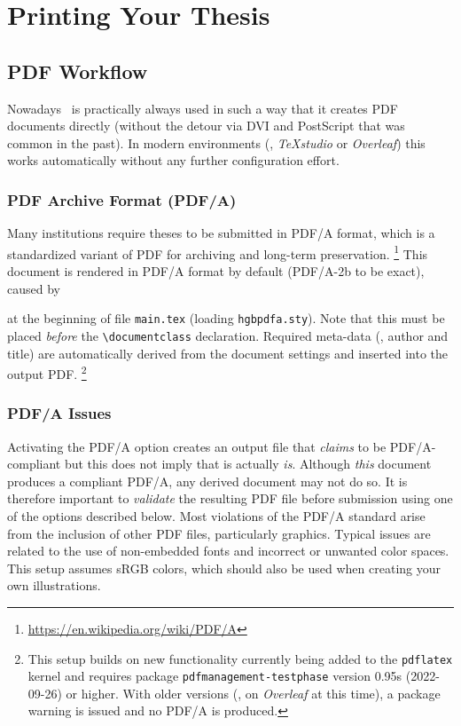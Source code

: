 \chapter{Printing Your Thesis}
\label{cha:Printing}


\section{PDF Workflow}
\label{sec:pdf-workflow}

Nowadays \latex\ is practically always used in such a way that it creates PDF
documents directly (without the detour via DVI and PostScript that was common
in the past). In modern environments (\eg, \emph{TeXstudio} or \emph{Overleaf})
this works automatically without any further configuration effort.


\subsection{PDF Archive Format (PDF/A)}
\label{sec:PDFA}

Many institutions require theses to be submitted in PDF/A format, which is a
standardized variant of PDF for archiving and long-term preservation.%
\footnote{\url{https://en.wikipedia.org/wiki/PDF/A}}
This document is rendered in PDF/A format by default (PDF/A-2b to be exact),
caused by
%
\begin{LaTeXCode}[numbers=none]
\RequirePackage{hgbpdfa}
\end{LaTeXCode}
%
at the beginning of file \verb!main.tex! (loading \verb!hgbpdfa.sty!).
Note that this must be placed \emph{before} the \verb!\documentclass!
declaration. Required meta-data (\eg, author and title) are automatically 
derived from the document settings and inserted into the output PDF.%
\footnote{This setup builds on new functionality currently being added to
the \texttt{pdflatex} kernel and requires package \texttt{pdfmanagement-testphase}
version 0.95s (2022-09-26) or higher. With older versions (\eg, on \emph{Overleaf}
at this time), a package warning is issued and no PDF/A is produced.}


\subsection{PDF/A Issues}
\label{sec:PDFA-issues}

Activating the PDF/A option creates an output file that \emph{claims} to be 
PDF/A-compliant but this does not imply that is actually \emph{is}.
Although \emph{this} document produces a compliant PDF/A, any derived document
may not do so. It is therefore important to \emph{validate} the resulting PDF file
before submission using one of the options described below. Most violations
of the PDF/A standard arise from the inclusion of other PDF files, particularly 
graphics. Typical issues are related to the use of non-embedded fonts
and incorrect or unwanted color spaces. This setup assumes sRGB colors, 
which should also be used when creating your own illustrations.

